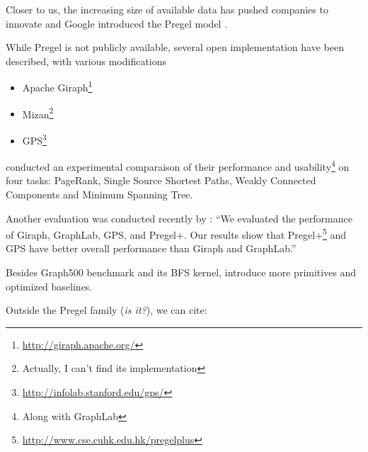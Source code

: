 Closer to us, the increasing size of available data has pushed companies to
innovate and Google introduced the Pregel model \autocite{Pregel10}.

While Pregel is not publicly available, several open implementation have been
described, with various modifications

\begin{itemize}
	\item Apache
		Giraph\footnote{\href{http://giraph.apache.org/}{http://giraph.apache.org/}}
	\item Mizan\footnote{Actually, I can't find its implementation} \autocite{Khayyat2013}
	\item
		GPS\footnote{\href{http://infolab.stanford.edu/gps/}{http://infolab.stanford.edu/gps/}}
		\autocite{Salihoglu2013}
\end{itemize}

\Textcite{Han2014} conducted an experimental comparaison of their performance and
usability\footnote{Along with GraphLab} on four tasks: PageRank, Single Source
Shortest Paths, Weakly Connected Components and Minimum Spanning Tree.

Another evaluation was conducted recently by \textcite{Lu2015}: \enquote{We
evaluated the performance of Giraph, GraphLab, GPS, and Pregel+. Our results
show that
Pregel+\footnote{\href{http://www.cse.cuhk.edu.hk/pregelplus/index.html}%
{http://www.cse.cuhk.edu.hk/pregelplus}} \autocite{Yan2015} and GPS have
better overall performance than Giraph and GraphLab.}

Besides Graph500 benchmark and its BFS kernel, \textcite{Beamer2015} introduce
more primitives and optimized baselines.

Outside the Pregel family (\emph{is it?}), we can cite:

